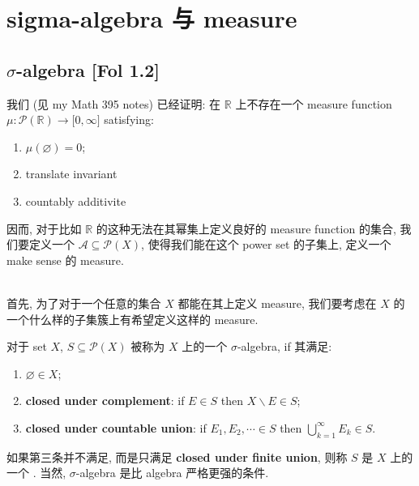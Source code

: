 \chapter{sigma-algebra 与 measure}\label{sigma-algebra-ux4e0e-measure}

\section{\texorpdfstring{\(\sigma\)-algebra {[}Fol 1.2{]}}{\textbackslash sigma-algebra {[}Fol 1.2{]}}}

我们 (见 my Math 395 notes) 已经证明: 在 \(\mathbb{R}\) 上不存在一个 measure function \(\mu:\mathcal{P}(\mathbb{R})\rightarrow\lbrack 0,\infty\rbrack\) satisfying:

\begin{enumerate}
\item
  \(\mu(\varnothing) = 0\);
\item
  translate invariant
\item
  countably additivite
\end{enumerate}

因而, 对于比如 \(\mathbb{R}\) 的这种无法在其幂集上定义良好的 measure function 的集合, 我们要定义一个 \(\mathcal{A} \subseteq \mathcal{P}(X)\), 使得我们能在这个 power set 的子集上, 定义一个 make sense 的 measure.\\
\strut \\
首先, 为了对于一个任意的集合 \(X\) 都能在其上定义 measure, 我们要考虑在 \(X\) 的一个什么样的子集簇上有希望定义这样的 measure.

\begin{definition}{}

对于 set \(X\), \(S \subseteq \mathcal{P}(X)\) 被称为 \(X\) 上的一个 \(\sigma\)-algebra, if 其满足:

\begin{enumerate}
\item
  \(\varnothing \in X\);
\item
  \textbf{closed under complement}: if \(E \in S\) then \(X\backslash E \in S\);
\item
  \textbf{closed under countable union}: if \(E_{1},E_{2},\cdots \in S\) then \(\bigcup_{k = 1}^{\infty}E_{k} \in S\).
\end{enumerate}

如果第三条并不满足, 而是只满足 \textbf{closed under finite union}, 则称 \(S\) 是 \(X\) 上的一个 . 当然, \(\sigma\)-algebra 是比 algebra 严格更强的条件.

\end{definition}

